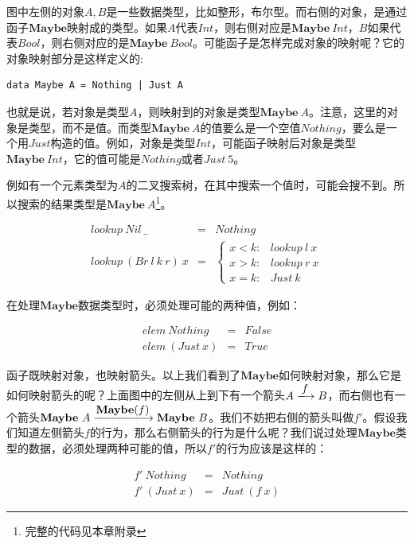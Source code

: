 \documentclass[b5paper]{ctexart}
\begin{document}
\begin{example}
图中左侧的对象$A, B$是一些数据类型，比如整形，布尔型。而右侧的对象，是通过函子$\mathbf{Maybe}$映射成的类型。如果$A$代表$Int$，则右侧对应是$\mathbf{Maybe}\ Int$，$B$如果代表$Bool$，则右侧对应的是$\mathbf{Maybe}\ Bool$。可能函子是怎样完成对象的映射呢？它的对象映射部分是这样定义的:

\lstset{frame=none}
\begin{lstlisting}
data Maybe A = Nothing | Just A
\end{lstlisting}

也就是说，若对象是类型$A$，则映射到的对象是类型$\mathbf{Maybe}\ A$。注意，这里的对象是类型，而不是值。而类型$\mathbf{Maybe}\ A$的值要么是一个空值$Nothing$，要么是一个用$Just$构造的值。例如，对象是类型$Int$，可能函子映射后对象是类型$\mathbf{Maybe}\ Int$，它的值可能是$Nothing$或者$Just\ 5$。

例如有一个元素类型为$A$的二叉搜索树，在其中搜索一个值时，可能会搜不到。所以搜索的结果类型是$\mathbf{Maybe}\ A$\footnote{完整的代码见本章附录}。

\[
\begin{array}{rcl}
lookup\ Nil\ \_ & = & Nothing \\
lookup\ (Br\ l\ k\ r)\ x & = & \begin{cases}
  x < k: & lookup\ l\ x \\
  x > k: & lookup\ r\ x \\
  x = k: & Just\ k
\end{cases}
\end{array}
\]

在处理$\mathbf{Maybe}$数据类型时，必须处理可能的两种值，例如：

\[
\begin{array}{lcl}
elem\ Nothing & = & False \\
elem\ (Just\ x) & = & True
\end{array}
\]

函子既映射对象，也映射箭头。以上我们看到了$\mathbf{Maybe}$如何映射对象，那么它是如何映射箭头的呢？上面图中的左侧从上到下有一个箭头$A \arrowto{f} B$，而右侧也有一个箭头$\mathbf{Maybe}\ A \arrowto{\mathbf{Maybe}(f)} \mathbf{Maybe}\ B$。我们不妨把右侧的箭头叫做$f'$。假设我们知道左侧箭头$f$的行为，那么右侧箭头的行为是什么呢？我们说过处理$\mathbf{Maybe}$类型的数据，必须处理两种可能的值，所以$f'$的行为应该是这样的：

\[
\begin{array}{lcl}
f'\ Nothing & = & Nothing \\
f'\ (Just\ x) & = & Just\ (f\ x)
\end{array}
\]


\end{example}
\end{document}
